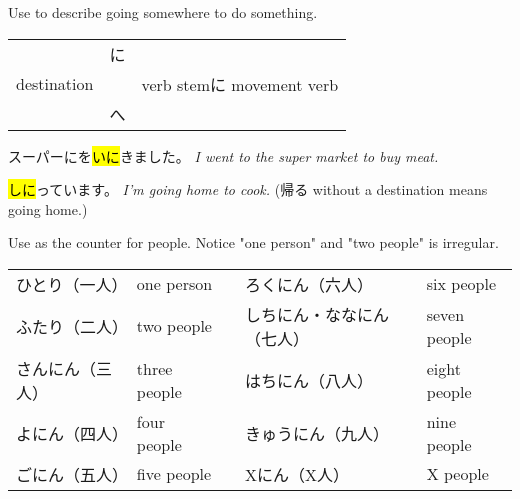     {
    Use to describe going somewhere to do something.

    \begin{center}
        \begin{tabular}{|ccc|}
            \hline
                        & に & \\
            destination &    & verb stemに movement verb \\
                        & へ & \\
            \hline
        \end{tabular}
    \end{center}

    スーパーにを\hl{いに}きました。
    \textit{I went to the super market to buy meat.}

    \hl{しに}っています。
    \textit{I'm going home to cook.} (帰る without a destination means going home.)
    }

    {
    Use  as the counter for people. Notice "one person" and "two people" is irregular.
    
    \begin{tabular}{|llcll|}
        \hline
        ひとり（一人）  & one person   & \hspace{5mm} & ろくにん（六人）          & six people \\
        ふたり（二人）  & two people   &              & しちにん・ななにん（七人）& seven people \\
        さんにん（三人）& three people &              & はちにん（八人）          & eight people \\
        よにん（四人）  & four people  &              & きゅうにん（九人）        & nine people \\
        ごにん（五人）  & five people  &              & Xにん（X人）              & X people \\
        \hline
    \end{tabular}
    }
